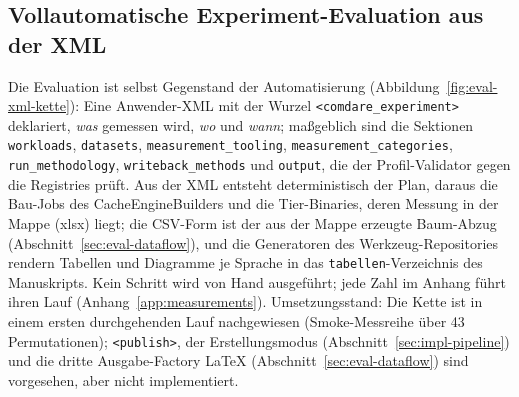 \begin{nurkurz}
\subsection{Vollautomatische Experiment-Evaluation aus der XML}\label{sec:eval-xml}
Die Evaluation ist selbst Gegenstand der Automatisierung (Abbildung~\ref{fig:eval-xml-kette}): Eine
Anwender-XML mit der Wurzel \texttt{<comdare\_experiment>} deklariert, \emph{was} gemessen wird, \emph{wo}
und \emph{wann}; maßgeblich sind die Sektionen \texttt{workloads}, \texttt{datasets},
\texttt{measurement\_tooling}, \texttt{measurement\_categories}, \texttt{run\_methodology},
\texttt{writeback\_methods} und \texttt{output}, die der Profil-Validator gegen die Registries prüft. Aus
der XML entsteht deterministisch der Plan, daraus die Bau-Jobs des CacheEngineBuilders und die
Tier-Binaries, deren Messung in der Mappe (xlsx) liegt; die CSV-Form ist der aus der Mappe erzeugte
Baum-Abzug (Abschnitt~\ref{sec:eval-dataflow}), und die Generatoren des Werkzeug-Repositories rendern
Tabellen und Diagramme je Sprache in das \texttt{tabellen}-Verzeichnis des Manuskripts. Kein Schritt wird
von Hand ausgeführt; jede Zahl im Anhang führt ihren Lauf (Anhang~\ref{app:measurements}).
Umsetzungsstand: Die Kette ist in einem ersten durchgehenden Lauf nachgewiesen (Smoke-Messreihe über 43
Permutationen); \texttt{<publish>}, der Erstellungsmodus (Abschnitt~\ref{sec:impl-pipeline}) und die dritte
Ausgabe-Factory LaTeX (Abschnitt~\ref{sec:eval-dataflow}) sind vorgesehen, aber nicht implementiert.
\begin{figure}[htbp]\centering
\end{figure}
\end{nurkurz}

